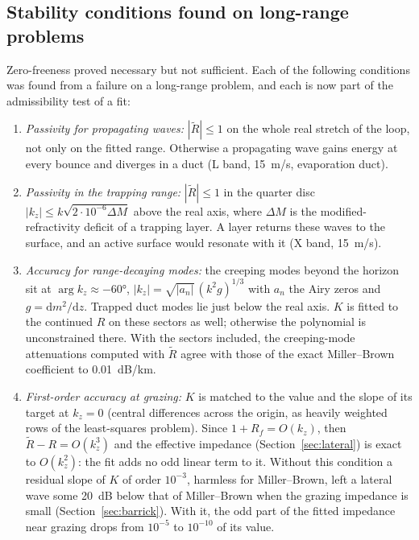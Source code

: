 \documentclass[11pt,a4paper]{article}
\newcommand{\kz}{k_z}
\newcommand{\Rt}{\tilde R}
\begin{document}
\subsection{Stability conditions found on long-range problems}
Zero-freeness proved necessary but not sufficient. Each of the following
conditions was found from a failure on a long-range problem, and each is now part of
the admissibility test of a fit:
\begin{enumerate}
\item \emph{Passivity for propagating waves:} $|\Rt|\le1$ on the whole real stretch of
  the loop, not only on the fitted range. Otherwise a propagating wave gains energy
  at every bounce and diverges in a duct (L band, \SI{15}{m/s}, evaporation duct).
\item \emph{Passivity in the trapping range:} $|\Rt|\le1$ in the quarter disc
  $|\kz|\le k\sqrt{2\cdot10^{-6}\Delta M}$ above the real axis, where $\Delta M$ is the
  modified-refractivity deficit of a trapping layer. A layer returns these waves to
  the surface, and an active surface would resonate with it (X band, \SI{15}{m/s}).
\item \emph{Accuracy for range-decaying modes:} the creeping modes beyond the horizon
  sit at $\arg\kz\approx-\ang{60}$, $|\kz|=\sqrt{|a_n|}\,(k^2g)^{1/3}$ with $a_n$ the Airy
  zeros and $g=\mathrm{d}m^2/\mathrm{d}z$. Trapped duct modes lie just below the real
  axis. $K$ is fitted to the continued $R$ on these sectors as well; otherwise the
  polynomial is unconstrained there. With the sectors included, the creeping-mode
  attenuations computed with $\Rt$ agree with those of the exact Miller--Brown
  coefficient to \SI{0.01}{dB/km}.
\item \emph{First-order accuracy at grazing:} $K$ is matched to the value and the
  slope of its target at $\kz=0$ (central differences across the origin, as
  heavily weighted rows of the least-squares problem). Since $1+R_f=O(\kz)$, then
  $\Rt-R=O(\kz^3)$ and the effective impedance (Section~\ref{sec:lateral}) is exact
  to $O(\kz^2)$: the fit adds no odd linear term to it. Without this condition a
  residual slope of $K$ of order $10^{-3}$, harmless for Miller--Brown, left a
  lateral wave some \SI{20}{dB} below that of Miller--Brown when the grazing
  impedance is small (Section~\ref{sec:barrick}). With it, the odd part of the fitted
  impedance near grazing drops from $10^{-5}$ to $10^{-10}$ of its value.
\end{enumerate}

\end{document}
